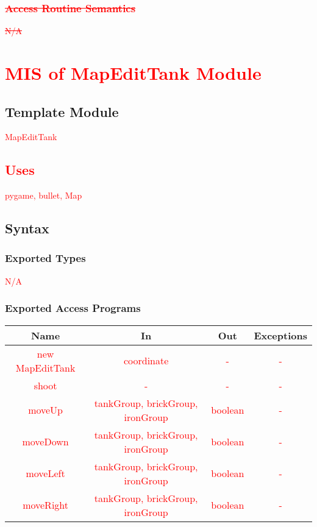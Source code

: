 \documentclass[12pt, titlepage]{article}
\DeclareRobustCommand{\hsout}[1]{\texorpdfstring{\sout{#1}}{#1}}
\begin{document}
		\subsubsection{\textcolor{red}{\hsout{Access Routine Semantics}}}
        \textcolor{red}{\sout{N/A}}
        


\section{\textcolor{red}{MIS of MapEditTank Module}}
        \subsection{Template Module}
        \textcolor{red}{MapEditTank}
        \subsection{\textcolor{red}{Uses}}
        \textcolor{red}{pygame, bullet, Map}
		\subsection{Syntax}
		\subsubsection{Exported Types}
        \textcolor{red}{N/A}
		\subsubsection{Exported Access Programs}
		\begin{tabular}[pos]{|c|c|c|c|}
					
					\hline
					\textbf{Name}& \textbf{In} & \textbf{Out} & \textbf{Exceptions} \\ \hline
					\textcolor{red}{new MapEditTank} & \textcolor{red}{coordinate} & \textcolor{red}{-} & \textcolor{red}{-} \\ \hline
					\textcolor{red}{shoot} & \textcolor{red}{-} & \textcolor{red}{-} & \textcolor{red}{-} \\ \hline
					\textcolor{red}{moveUp} & \textcolor{red}{tankGroup, brickGroup, ironGroup} & \textcolor{red}{boolean} & \textcolor{red}{-} \\ \hline
					\textcolor{red}{moveDown} & \textcolor{red}{tankGroup, brickGroup, ironGroup} & \textcolor{red}{boolean} & \textcolor{red}{-} \\ \hline
					\textcolor{red}{moveLeft} & \textcolor{red}{tankGroup, brickGroup, ironGroup} & \textcolor{red}{boolean} & \textcolor{red}{-} \\ \hline
					\textcolor{red}{moveRight} & \textcolor{red}{tankGroup, brickGroup, ironGroup} & \textcolor{red}{boolean} & \textcolor{red}{-} \\ \hline
					
			    \end{tabular}
\end{document}
